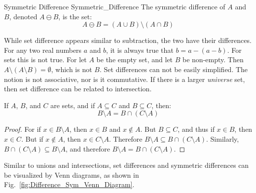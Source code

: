         \begin{ldefinition}{Symmetric Difference}
              {Symmetric_Difference}
            The symmetric difference of $A$ and $B$, denoted
            $A\ominus{B}$, is the set:
            \begin{equation}
                A\ominus{B}
                =(A\cup{B})\setminus(A\cap{B})
            \end{equation}
        \end{ldefinition}
        While set difference appears similar to subtraction,
        the two have their differences. For any two real
        numbers $a$ and $b$, it is always true that
        $b=a-(a-b)$. For sets this is not true. For let $A$
        be the empty set, and let $B$ be non-empty.
        Then $A\setminus(A\setminus{B})=\emptyset$, which
        is not $B$. Set differences can not be easily
        simplified. The notion is not associative, nor is it
        commutative. If there is a larger \textit{universe}
        set, then set difference can be related to
        intersection.
        \begin{theorem}
            \label{thm:Set_Difference_As_Intersection}%
            If $A$, $B$, and $C$ are sets, and if
            $A\subseteq{C}$ and $B\subseteq{C}$, then:
            \begin{equation}
                B\setminus{A}=B\cap(C\setminus{A})
            \end{equation}
        \end{theorem}
        \begin{proof}
            For if $x\in{B}\setminus{A}$, then
            $x\in{B}$ and $x\notin{A}$. But
            $B\subseteq{C}$, and thus if $x\in{B}$, then
            $x\in{C}$. But if $x\notin{A}$, then
            $x\in{C}\setminus{A}$. Therefore
            $B\setminus{A}\subseteq{B}\cap(C\setminus{A})$.
            Similarly,
            $B\cap(C\setminus{A})\subseteq{B}\setminus{A}$,
            and therefore
            $B\setminus{A}={B}\cap(C\setminus{A})$.
        \end{proof}
        Similar to unions and intersections,
        set differences and symmetric differences can be
        visualized by Venn diagrams, as shown in
        Fig.~\ref{fig:Difference_Sym_Venn_Diagram}.
